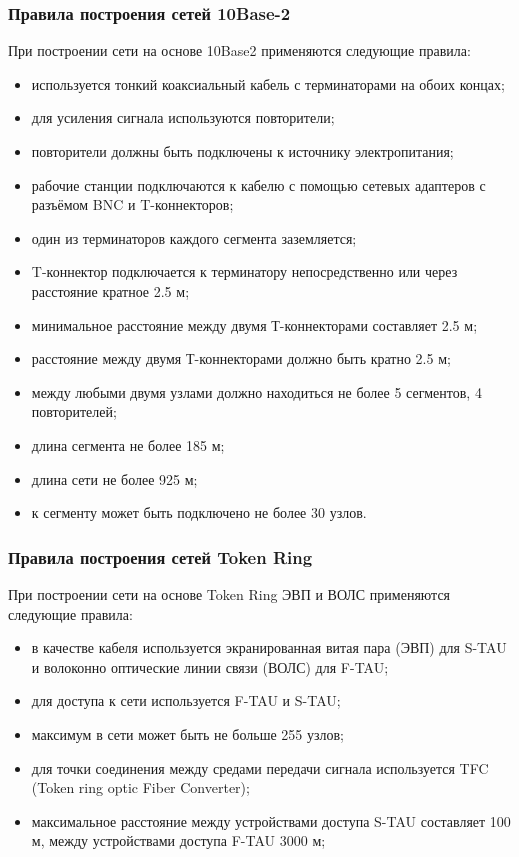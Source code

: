 \documentclass[russian,utf8,emptystyle]{eskdtext}
\begin{document}
\subsubsection{Правила построения сетей 10Base-2}
При построении сети на основе 10Base2 применяются следующие правила:
\begin{itemize}[label=-]
\item используется тонкий коаксиальный кабель с терминаторами на обоих концах;
\item для усиления сигнала используются повторители;
\item повторители должны быть подключены к источнику электропитания;
\item рабочие станции подключаются к кабелю с помощью сетевых адаптеров с разъёмом BNC и T-коннекторов;
\item один из терминаторов каждого сегмента заземляется;
\item T-коннектор подключается к терминатору непосредственно или через расстояние кратное 2.5 м;
\item минимальное расстояние между двумя Т-коннекторами составляет 2.5 м;
\item расстояние между двумя Т-коннекторами должно быть кратно 2.5 м;
\item между любыми двумя узлами должно находиться не более 5 сегментов, 4 повторителей;
\item длина сегмента не более 185 м;
\item длина сети не более 925 м;
\item к сегменту может быть подключено не более 30 узлов.
\end{itemize}

\subsubsection{Правила построения сетей Token Ring}
При построении сети на основе Token Ring ЭВП и ВОЛС применяются следующие правила:
\begin{itemize}[label=-]
\item в качестве кабеля используется экранированная витая пара (ЭВП) для S-TAU и волоконно оптические линии связи (ВОЛС) для F-TAU;
\item для доступа к сети используется F-TAU и S-TAU;
\item максимум в сети может быть не больше 255 узлов;
\item для точки соединения между средами передачи сигнала используется TFC (Token ring optic Fiber Converter);
\item максимальное расстояние между устройствами доступа S-TAU составляет 100 м, между устройствами доступа F-TAU 3000 м;
\end{itemize}
\end{document}
